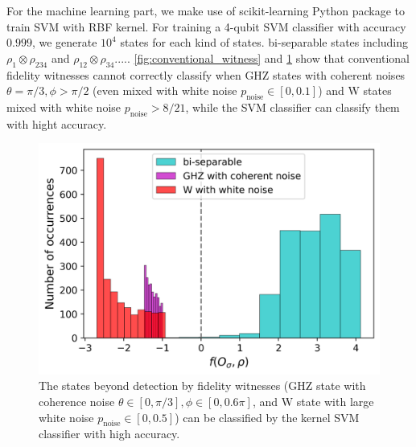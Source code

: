 \documentclass[
aps,
pra,
twocolumn,
floatfix,
]{revtex4-2}
\theoremstyle{plain}
\theoremstyle{definition}
\newcommand{\dm}{\rho}
\newcommand{\noise}{\text{noise}}
\begin{document}
For the machine learning part, we make use of scikit-learning Python package \cite{pedregosaScikitlearnMachineLearning2011} to train SVM with RBF kernel.
For training a 4-qubit SVM classifier with accuracy $0.999$, we generate $10^4$ states for each kind of states.
bi-separable states including $\dm_{1}\otimes \dm_{234}$ and $\dm_{12}\otimes \dm_{34}$.....
\cref{fig:conventional_witness} and \cref{fig:ml_compare} show that conventional fidelity witnesses cannot correctly classify when GHZ states with coherent noises $\theta=\pi/3,\phi>\pi/2$ (even mixed with white noise $p_\noise \in [0,0.1]$) and W states mixed with white noise $p_{\noise}>8/21$,
while the SVM classifier can classify them with hight accuracy.
\begin{figure}[!ht]
	\centering
		\includegraphics[width=.9\linewidth]{./Code/three_qubit_hist_ML.png}
	\caption{The states beyond detection by fidelity witnesses (GHZ state with coherence noise $\theta\in[0,\pi/3], \phi\in[0,0.6\pi]$, and W state with large white noise $p_{\noise}\in[0,0.5]$) can be classified by the kernel SVM classifier with high accuracy.}
	\label{fig:ml_compare}
\end{figure}
\end{document}
